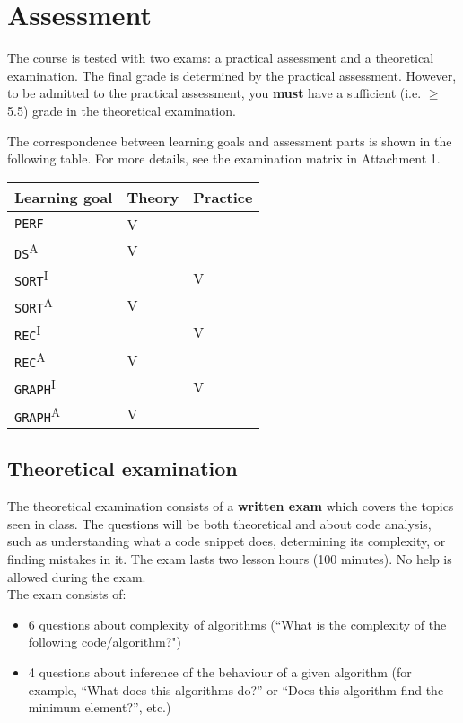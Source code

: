 \section{Assessment}
	The course is tested with two exams: a practical assessment and a theoretical examination. The final grade is determined by the practical assessment. However, to be admitted to the practical assessment, you \textbf{must} have a sufficient (i.e. $\geq$ 5.5) grade in the theoretical examination.
	
	The correspondence between learning goals and assessment parts is shown in the following table. For more details, see the examination matrix in Attachment 1. \\
	
	\begin{table}[h]
		\centering
	\begin{tabular}{ |l|l|l| }
		\hline
		\textbf{Learning goal} & \textbf{Theory} & \textbf{Practice} \\
		\hline
		\texttt{PERF} & V & \\
		\hline 
		\texttt{DS}\textsuperscript{A} & V & \\
		\hline 
		\texttt{SORT}\textsuperscript{I} & & V \\
		\hline 
		\texttt{SORT}\textsuperscript{A} & V & \\
		\hline 
		\texttt{REC}\textsuperscript{I} & & V \\
		\hline 
		\texttt{REC}\textsuperscript{A} & V &  \\
		\hline 
		\texttt{GRAPH}\textsuperscript{I} & & V \\
		\hline 
		\texttt{GRAPH}\textsuperscript{A} & V & \\
		\hline 
	\end{tabular}
	\end{table}

	\subsection{Theoretical examination}
	The theoretical examination consists of a \textbf{written exam} which covers the topics seen in class. The questions will be both theoretical and about code analysis, such as understanding what a code snippet does, determining its complexity, or finding mistakes in it.
	The exam lasts two lesson hours (100 minutes). No help is allowed during the exam.\\
	
	The exam consists of: 
	\begin{itemize}
		\item 6 questions about complexity of algorithms (``What is the complexity of the following code/algorithm?")
		\item 4 questions about inference of the behaviour of a given algorithm (for example, ``What does this algorithms do?\textquotedblright{} or ``Does this algorithm find the minimum element?\textquotedblright, etc.)
	\end{itemize}

